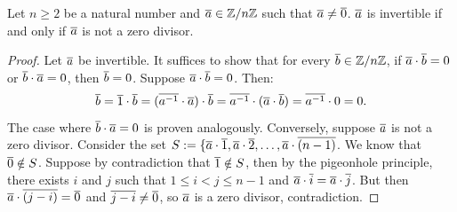 \begin{propbox}
   Let $n \geq 2$ be a natural number and $\overline{a} \in \mathbb{Z}/n\mathbb{Z}$ such that $\overline{a} \neq \overline{0}$. $\overline{a}$ is invertible if and only if $\overline{a}$ is not a zero divisor. 
\end{propbox}
\begin{proof}
   Let $\overline{a}$ be invertible. It suffices to show that for every $\overline{b} \in \mathbb{Z}/n\mathbb{Z}$, if $\overline{a} \cdot \overline{b} = 0$ or $\overline{b} \cdot \overline{a} = 0$, then $\overline{b} = 0$. Suppose $\overline{a} \cdot \overline{b} = 0$. Then:  
   \[ \overline{b} = \overline{1} \cdot \overline{b} = (\overline{a^{-1}} \cdot \overline{a}) \cdot \overline{b} = \overline{a^{-1}} \cdot (\overline{a} \cdot \overline{b}) = \overline{a^{-1}} \cdot 0 = 0. \]
   The case where $\overline{b} \cdot \overline{a} = 0$ is proven analogously. Conversely, suppose $\overline{a}$ is not a zero divisor. Consider the set $S := \{\overline{a} \cdot \overline{1}, \overline{a} \cdot \overline{2}, \dots, \overline{a} \cdot \overline{(n-1)}$. We know that $\overline{0} \notin S$. Suppose by contradiction that $\overline{1} \notin S$, then by the pigeonhole principle, there exists $i$ and $j$ such that $1 \leq i < j \leq n - 1$ and $\overline{a} \cdot \overline{i} = \overline{a} \cdot \overline{j}$. But then $\overline{a} \cdot \overline{(j - i)} = \overline{0}$ and $\overline{j - i} \neq \overline{0}$, so $\overline{a}$ is a zero divisor, contradiction. 
\end{proof}
